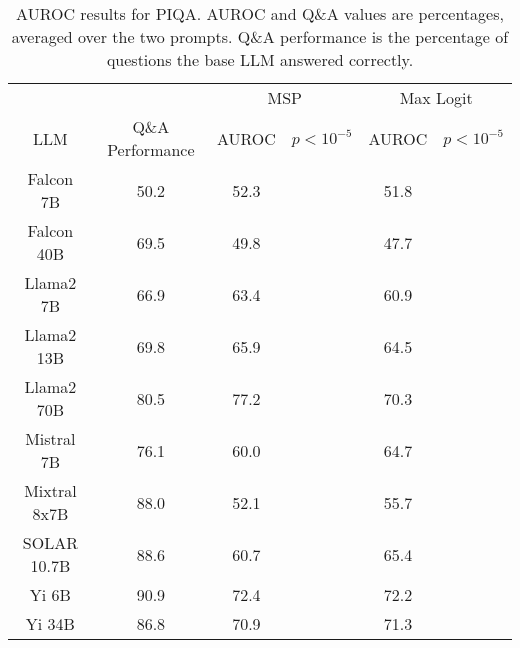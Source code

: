 \begin{table*}
\centering
\begin{tabular}{c|c|c|c|c|c}
& & \multicolumn{2}{c|}{MSP} & \multicolumn{2}{c}{Max Logit} \\ 
LLM & Q\&A Performance & AUROC & $p < 10^{-5}$ & AUROC & $p < 10^{-5}$\\ \hline
Falcon 7B & 50.2 & 52.3 &  & 51.8 & \\
Falcon 40B & 69.5 & 49.8 &  & 47.7 & \\
Llama2 7B & 66.9 & 63.4 &  & 60.9 & \\
Llama2 13B & 69.8 & 65.9 &  & 64.5 & \\
Llama2 70B & 80.5 & 77.2 &  & 70.3 & \\
Mistral 7B & 76.1 & 60.0 &  & 64.7 & \\
Mixtral 8x7B & 88.0 & 52.1 &  & 55.7 & \\
SOLAR 10.7B & 88.6 & 60.7 &  & 65.4 & \\
Yi 6B & 90.9 & 72.4 &  & 72.2 & \\
Yi 34B & 86.8 & 70.9 &  & 71.3 & \\
\hline
\end{tabular}
\caption{AUROC results for PIQA. AUROC and Q\&A values are percentages, averaged over the two prompts. Q\&A performance is the percentage of questions the base LLM answered correctly.}
\label{tab:piqa_auroc}
\end{table*}
